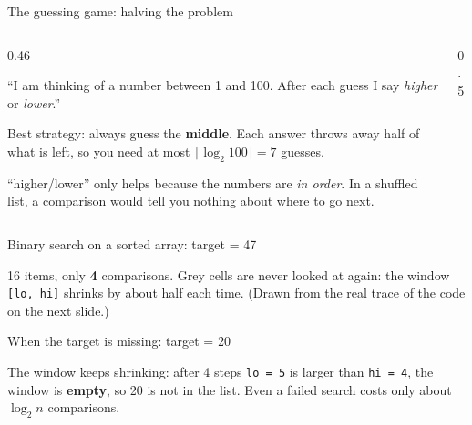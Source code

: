 \documentclass[aspectratio=169,10pt]{beamer}
\begin{document}
\begin{frame}{The guessing game: halving the problem}
\begin{columns}[T]
\begin{column}{0.46\textwidth}
{\small
``I am thinking of a number between 1 and 100. After each guess I say \emph{higher} or \emph{lower}.''

\vspace{2mm}
Best strategy: always guess the \textbf{middle}. Each answer throws away half of what is left, so you need at most $\lceil\log_2 100\rceil = 7$ guesses.

\vspace{2mm}
 ``higher/lower'' only helps because the numbers are \emph{in order}. In a shuffled list, a comparison would tell you nothing about where to go next.}
\end{column}
\begin{column}{0.5\textwidth}
\begin{sfig}[0.6]
\end{sfig}
\end{column}
\end{columns}
\end{frame}

\begin{frame}{Binary search on a sorted array: target = 47}
\begin{sfig}[0.66]
\begin{tikzpicture}
  
\end{tikzpicture}
\end{sfig}
\vspace{1mm}
{\small 16 items, only \textbf{4} comparisons. Grey cells are never looked at again: the window \texttt{[lo, hi]} shrinks by about half each time. (Drawn from the real trace of the code on the next slide.)}
\end{frame}

\begin{frame}{When the target is missing: target = 20}
\begin{sfig}[0.68]
\begin{tikzpicture}
  
\end{tikzpicture}
\end{sfig}
\vspace{1mm}
{\small The window keeps shrinking: after 4 steps \texttt{lo = 5} is larger than \texttt{hi = 4}, the window is \textbf{empty}, so 20 is not in the list. Even a failed search costs only about $\log_2 n$ comparisons.}
\end{frame}
\end{document}
